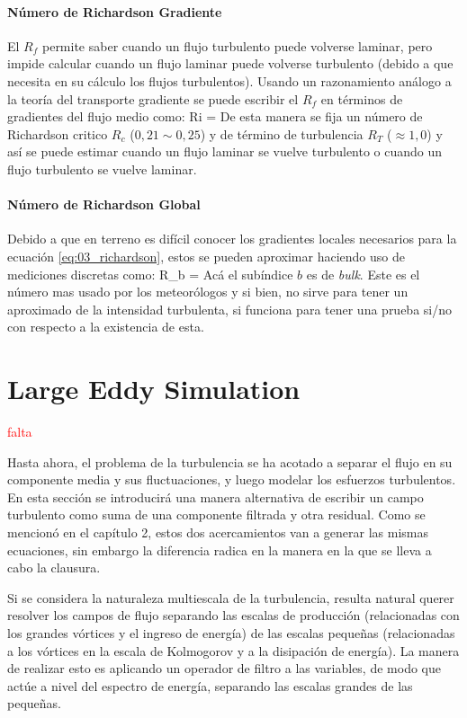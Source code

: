 \paragraph{Número de Richardson Gradiente} El $R_f$ permite saber cuando un flujo turbulento puede volverse laminar, pero impide calcular cuando un flujo laminar puede volverse turbulento (debido a que necesita en su cálculo los flujos turbulentos). Usando un razonamiento análogo a la teoría del transporte gradiente se puede escribir el $R_f$ en términos de gradientes del flujo medio como: 
\be\label{eq:03_richardson} Ri =  \ee
De esta manera se fija un número de Richardson critico $R_c$ ($0,21\sim0,25$) y de término de turbulencia $R_T$ ($\approx1,0$) y así se puede estimar cuando un flujo laminar se vuelve turbulento o cuando un flujo turbulento se vuelve laminar.
\paragraph{Número de Richardson Global} Debido a que en terreno es difícil conocer los gradientes locales necesarios para la ecuación \ref{eq:03_richardson}, estos se pueden aproximar haciendo uso de mediciones discretas como:
\be R_b =  \ee
Acá el subíndice $b$ es de \emph{bulk}. Este es el número mas usado por los meteorólogos y si bien, no sirve para tener un aproximado de la intensidad turbulenta, si funciona para tener una prueba si/no con respecto a la existencia de esta.
\newpage

\section{Large Eddy Simulation}
\textcolor{red}{falta}

Hasta ahora, el problema de la turbulencia se ha acotado a separar el flujo en su componente media y sus fluctuaciones, y luego modelar los esfuerzos turbulentos. En esta sección se introducirá una manera alternativa de escribir un campo turbulento como suma de una componente filtrada y otra residual. Como se mencionó en el capítulo 2, estos dos acercamientos van a generar las mismas ecuaciones, sin embargo la diferencia radica en la manera en la que se lleva a cabo la clausura.

Si se considera la naturaleza multiescala de la turbulencia, resulta natural querer resolver los campos de flujo separando las escalas de producción (relacionadas con los grandes vórtices y el ingreso de energía) de las escalas pequeñas (relacionadas a los vórtices en la escala de Kolmogorov y a la disipación de energía). La manera de realizar esto es aplicando un operador de filtro a las variables, de modo que actúe a nivel del espectro de energía, separando las escalas grandes de las pequeñas. 

